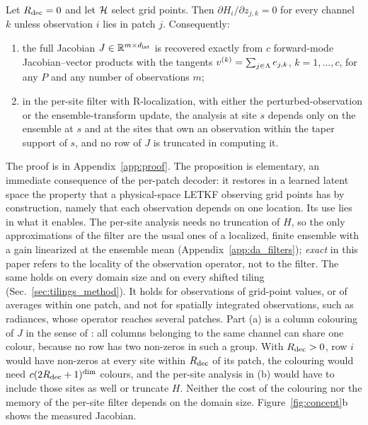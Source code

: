 \begin{proposition}
\label{prop:blockdiag}
Let $R_{\mathrm{dec}}=0$ and let $\mathcal{H}$ select grid points. Then
$\partial H_i/\partial z_{j,k} = 0$ for every channel $k$ unless
observation $i$ lies in patch $j$. Consequently:
\begin{enumerate}
\item[(a)] the full Jacobian $J\in\mathbb{R}^{m\times d_{\mathrm{lat}}}$ is recovered exactly
  from $c$ forward-mode Jacobian--vector products with the tangents
  $v^{(k)} = \sum_{j\in\Lambda} e_{j,k}$, $k=1,\dots,c$, for any $P$ and any
  number of observations $m$;
\item[(b)] in the per-site filter with R-localization, with either the
  perturbed-observation or the ensemble-transform update, the analysis at
  site $s$ depends only on the ensemble at $s$ and at the sites that own an
  observation within the taper support of $s$, and no row of $J$ is
  truncated in computing it.
\end{enumerate}
\end{proposition}

The proof is in Appendix~\ref{app:proof}. The proposition is elementary,
an immediate consequence of the per-patch decoder: it restores in a learned
latent space the property that a physical-space LETKF observing grid points
has by construction, namely that each observation depends on one location.
Its use lies in what it enables. The per-site analysis needs no truncation
of $H$, so the only approximations of the filter are the usual ones of a
localized, finite ensemble with a gain linearized at the ensemble mean
(Appendix~\ref{app:da_filters}); \emph{exact} in this paper refers to the
locality of the observation operator, not to the filter. The same holds on
every domain size and on every shifted tiling (Sec.~\ref{sec:tilings_method}).
It holds for observations of grid-point values, or of averages within one
patch, and not for spatially integrated observations, such as radiances,
whose operator reaches several patches. Part (a) is a column colouring
of $J$ in the sense of \citet{curtis1974}: all columns belonging to the
same channel can share one colour, because no row has two non-zeros in
such a group. With $R_{\mathrm{dec}}>0$, row $i$ would have non-zeros at every site
within $R_{\mathrm{dec}}$ of its patch, the colouring would need
$c(2R_{\mathrm{dec}}+1)^{\dim}$ colours, and the per-site analysis in (b) would have
to include those sites as well or truncate $H$. Neither the cost of the
colouring nor the memory of the per-site filter depends on the domain
size. Figure~\ref{fig:concept}b shows the measured Jacobian.

